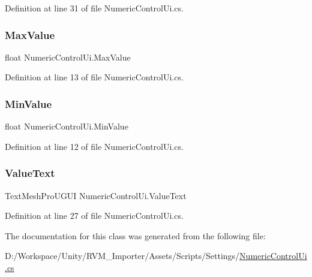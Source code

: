 Definition at line 31 of file Numeric\+Control\+Ui.\+cs.

\mbox{\label{class_numeric_control_ui_abea5d1fe4f626c1c6e28f79787f5b8b7}} 
\subsubsection{\texorpdfstring{MaxValue}{MaxValue}}
{\footnotesize\ttfamily float Numeric\+Control\+Ui.\+Max\+Value}



Definition at line 13 of file Numeric\+Control\+Ui.\+cs.

\mbox{\label{class_numeric_control_ui_a1b5a87a59a991fd86ac43cf307ef31e5}} 
\subsubsection{\texorpdfstring{MinValue}{MinValue}}
{\footnotesize\ttfamily float Numeric\+Control\+Ui.\+Min\+Value}



Definition at line 12 of file Numeric\+Control\+Ui.\+cs.

\mbox{\label{class_numeric_control_ui_a3a720216d8b23201f1fa31969104da88}} 
\subsubsection{\texorpdfstring{ValueText}{ValueText}}
{\footnotesize\ttfamily Text\+Mesh\+Pro\+U\+G\+UI Numeric\+Control\+Ui.\+Value\+Text}



Definition at line 27 of file Numeric\+Control\+Ui.\+cs.



The documentation for this class was generated from the following file\+:\begin{DoxyCompactItemize}
\item 
D\+:/\+Workspace/\+Unity/\+R\+V\+M\+\_\+\+Importer/\+Assets/\+Scripts/\+Settings/\mbox{\hyperlink{_numeric_control_ui_8cs}{Numeric\+Control\+Ui.\+cs}}\end{DoxyCompactItemize}
